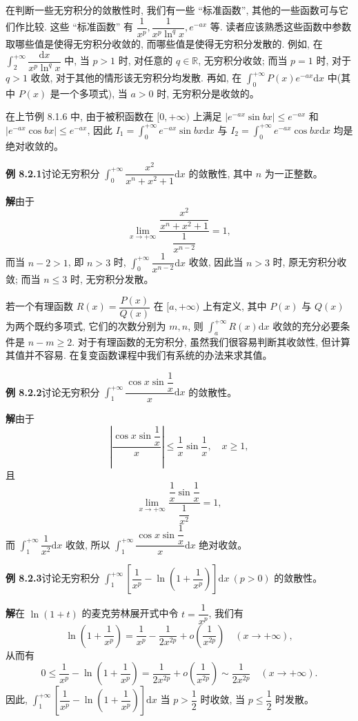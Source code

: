 \documentclass[UTF8, 12pt, fontset=fandol, oneside]{ctexart}
\begin{document}
在判断一些无穷积分的敛散性时, 我们有一些 ``标准函数'', 其他的一些函数可与它们作比较. 这些 ``标准函数'' 有 $\dfrac1{x^p},\dfrac1{x^p\ln^q x},e^{-ax}$ 等. 读者应该熟悉这些函数中参数取哪些值是使得无穷积分收敛的, 而哪些值是使得无穷积分发散的. 例如, 在 $\int_2^{+\infty}\dfrac{\mathrm dx}{x^p\ln^q x}$ 中, 当 $p>1$ 时, 对任意的 $q\in\mathbb R$, 无穷积分收敛; 而当 $p=1$ 时, 对于 $q>1$ 收敛, 对于其他的情形该无穷积分均发散. 再如, 在 $\int_0^{+\infty}P(x)e^{-ax}\mathrm dx$ 中(其中 $P(x)$ 是一个多项式), 当 $a>0$ 时, 无穷积分是收敛的。

在上节例 8.1.6 中, 由于被积函数在 $[0,+\infty)$ 上满足 $|e^{-ax}\sin bx|\leq e^{-ax}$ 和 $|e^{-ax}\cos bx|\leq e^{-ax}$, 因此 $I_1=\int_0^{+\infty}e^{-ax}\sin bx\mathrm dx$ 与 $I_2=\int_0^{+\infty}e^{-ax}\cos bx\mathrm dx$ 均是绝对收敛的。

\noindent\textbf{例 8.2.1}\quad 讨论无穷积分 $\int_0^{+\infty}\dfrac{x^2}{x^n+x^2+1}\mathrm dx$ 的敛散性, 其中 $n$ 为一正整数。

\noindent\textbf{解}\quad 由于
\[
  \lim_{x\to+\infty}
  \frac{\dfrac{x^2}{x^n+x^2+1}}{\dfrac1{x^{n-2}}}
  =
  1,
\]
而当 $n-2>1$, 即 $n>3$ 时, $\int_0^{+\infty}\dfrac1{x^{n-2}}\mathrm dx$ 收敛, 因此当 $n>3$ 时, 原无穷积分收敛; 而当 $n\leq3$ 时, 无穷积分发散。

若一个有理函数 $R(x)=\dfrac{P(x)}{Q(x)}$ 在 $[a,+\infty)$ 上有定义, 其中 $P(x)$ 与 $Q(x)$ 为两个既约多项式, 它们的次数分别为 $m,n$, 则 $\int_a^{+\infty}R(x)\mathrm dx$ 收敛的充分必要条件是 $n-m\geq2$. 对于有理函数的无穷积分, 虽然我们很容易判断其收敛性, 但计算其值并不容易. 在复变函数课程中我们有系统的办法来求其值。

\noindent\textbf{例 8.2.2}\quad 讨论无穷积分 $\int_1^{+\infty}\dfrac{\cos x\sin\dfrac1x}{x}\mathrm dx$ 的敛散性。

\noindent\textbf{解}\quad 由于
\[
  \left|\frac{\cos x\sin\dfrac1x}{x}\right|
  \leq
  \frac1x\sin\frac1x,\quad x\geq1,
\]
且
\[
  \lim_{x\to+\infty}
  \frac{\dfrac1x\sin\dfrac1x}{\dfrac1{x^2}}=1,
\]
而 $\int_1^{+\infty}\dfrac1{x^2}\mathrm dx$ 收敛, 所以 $\int_1^{+\infty}\dfrac{\cos x\sin\dfrac1x}{x}\mathrm dx$ 绝对收敛。

\noindent\textbf{例 8.2.3}\quad 讨论无穷积分 $\int_1^{+\infty}\left[\dfrac1{x^p}-\ln\left(1+\dfrac1{x^p}\right)\right]\mathrm dx\ (p>0)$ 的敛散性。

\noindent\textbf{解}\quad 在 $\ln(1+t)$ 的麦克劳林展开式中令 $t=\dfrac1{x^p}$, 我们有
\[
  \ln\left(1+\frac1{x^p}\right)
  =
  \frac1{x^p}-\frac1{2x^{2p}}+o\left(\frac1{x^{2p}}\right)
  \quad(x\to+\infty),
\]
从而有
\[
  0\leq
  \frac1{x^p}-\ln\left(1+\frac1{x^p}\right)
  =
  \frac1{2x^{2p}}+o\left(\frac1{x^{2p}}\right)
  \sim
  \frac1{2x^{2p}}
  \quad(x\to+\infty).
\]
因此, $\int_1^{+\infty}\left[\dfrac1{x^p}-\ln\left(1+\dfrac1{x^p}\right)\right]\mathrm dx$ 当 $p>\dfrac12$ 时收敛, 当 $p\leq\dfrac12$ 时发散。
\end{document}
